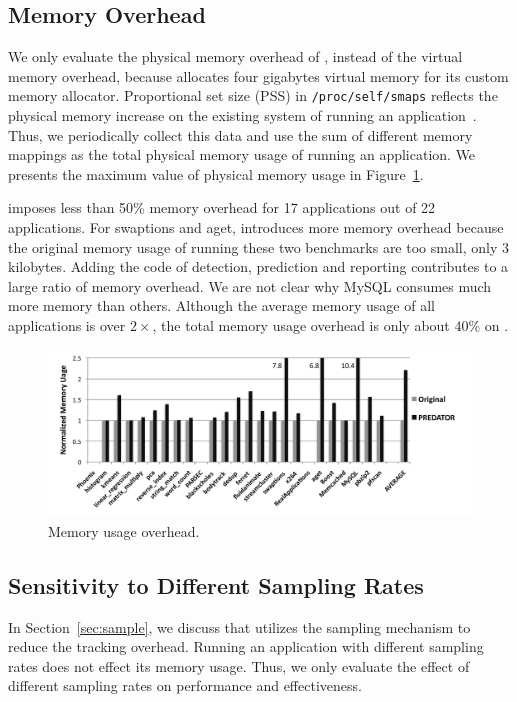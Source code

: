 \subsection{Memory Overhead}
\label{sec:memoverhead}
We only evaluate the physical memory overhead of \Predator{}, instead of the virtual memory overhead, because \Predator{} allocates four gigabytes virtual memory for its custom memory allocator. Proportional set size (PSS) in \texttt{/proc/self/smaps} reflects the physical memory increase on the existing system of running an application~\cite{memusage}. Thus, we periodically collect this data and use the sum of different memory mappings as the total physical memory usage of running an application. We presents the maximum value of physical memory usage in Figure~\ref{fig:memusage}. 

\Predator{} imposes less than 50\% memory overhead for 17 applications out of 22 applications.  For swaptions and aget, \Predator{} introduces more memory overhead because the original memory usage of running these two benchmarks are too small, only $3$ kilobytes. Adding the code of detection, prediction and reporting contributes to a large ratio of memory overhead. We are not clear why MySQL consumes much more memory than others. Although the average memory usage of all applications is over $2\times$, the total memory usage overhead is only about $40\%$ on \Predator{}. 

\begin{figure}
\begin{center} 
\includegraphics[width=6.5in]{fig/memusage}
\end{center}
\caption{Memory usage overhead.}
\label{fig:memusage}
\end{figure}


\subsection{Sensitivity to Different Sampling Rates}
\label{sec:sensitivity}
In Section~\ref{sec:sample}, we discuss that \Predator{} utilizes the sampling mechanism to reduce the tracking overhead. Running an application with different sampling rates does not effect its memory usage. Thus, we only evaluate the effect of different sampling rates on performance and effectiveness. 

